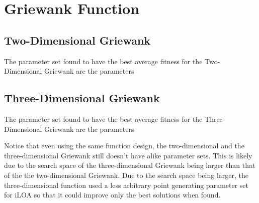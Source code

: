 \section{Griewank Function}

\subsection{Two-Dimensional Griewank}

\par The parameter set found to have the best average fitness for the Two-Dimensional Griewank are the parameters


\subsection{Three-Dimensional Griewank}

\par The parameter set found to have the best average fitness for the Three-Dimensional Griewank are the parameters


\par Notice that even using the same function design, the two-dimensional and the three-dimensional Griewank still doesn't have alike parameter sets. This is likely due to the search space of the three-dimensional Griewank being larger than that of the the two-dimensional Griewank. Due to the search space being larger, the three-dimensional function used a less arbitrary point generating parameter set for iLOA so that it could improve only the best solutions when found. 
